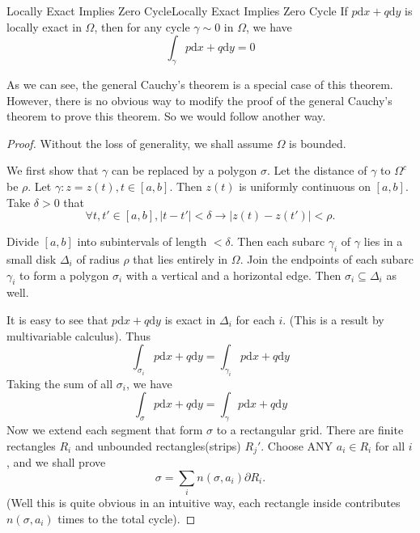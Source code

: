\documentclass[../main.tex]{subfiles}
\begin{document}
\begin{theorem}{Locally Exact Implies Zero Cycle}{Locally Exact Implies Zero Cycle}
	If $p \mathrm{d} x + q \mathrm{d} y$ is locally exact in $\Omega$, then for any cycle $\gamma\sim 0$ in $\Omega$, we have
	\begin{equation}
		\int_{\gamma} p \mathrm{d} x + q \mathrm{d} y = 0
	\end{equation}
\end{theorem}

As we can see, the general Cauchy's theorem is a special case of this theorem. However, there is no obvious way to modify the proof of the general Cauchy's theorem to prove this theorem. So we would follow another way.

\begin{proof}
Without the loss of generality, we shall assume $\Omega$ is bounded.

We first show that $\gamma$ can be replaced by a polygon $\sigma$. Let the distance of $\gamma$ to $\Omega^c$ be $\rho$. Let $\gamma: z=z(t), t\in [a,b]$. Then $z(t)$ is uniformly continuous on $[a,b]$. Take $\delta>0$ that
\begin{equation*}
	\forall t,t'\in [a,b], \left|t-t'\right|<\delta \rightarrow \left|z(t)-z(t')\right|<\rho.
\end{equation*}

Divide $[a,b]$ into subintervals of length $< \delta$. Then each subarc $\gamma_i$ of $\gamma$ lies in a small disk $\Delta_i$ of radius $\rho$ that lies entirely in $\Omega$. Join the endpoints of each subarc $\gamma_i$ to form a polygon $\sigma_i$ with a vertical and a horizontal edge. Then $\sigma_i \subseteq \Delta_i$ as well.

It is easy to see that $p \mathrm{d} x + q \mathrm{d} y$ is exact in $\Delta_i$ for each $i$. (This is a result by multivariable calculus). Thus
\begin{equation*}
	\int_{\sigma_i} p \mathrm{d}x + q \mathrm{d} y = \int_{\gamma_i} p \mathrm{d} x + q \mathrm{d} y
\end{equation*}
Taking the sum of all $\sigma_i$, we have
\begin{equation*}
	\int_{\sigma} p \mathrm{d} x + q \mathrm{d} y = \int_{\gamma} p \mathrm{d} x + q \mathrm{d} y
\end{equation*}
Now we extend each segment that form $\sigma$ to a rectangular grid. There are finite rectangles $R_i$ and unbounded rectangles(strips) $R_j'$. Choose ANY $a_i\in R_i$ for all $i$, and we shall prove
\begin{equation}
	\sigma = \sum_{i} n(\sigma,a_i) \partial R_i.
\end{equation}
(Well this is quite obvious in an intuitive way, each rectangle inside contributes $n(\sigma,a_i)$ times to the total cycle).


\end{proof}
\end{document}

